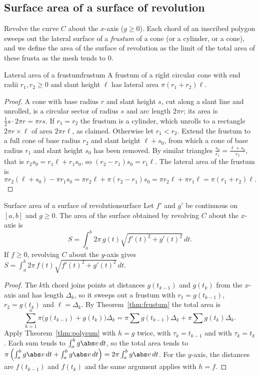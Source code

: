\documentclass[11pt]{article}
\begin{document}
\subsection*{Surface area of a surface of revolution}

Revolve the curve $C$ about the $x$-axis ($g\ge0$). Each chord of an inscribed polygon sweeps out the lateral surface of a \emph{frustum} of a cone (or a cylinder, or a cone), and we define the area of the surface of revolution as the limit of the total area of these frusta as the mesh tends to $0$.

\begin{thm}{Lateral area of a frustum}{frustum}
A frustum of a right circular cone with end radii $r_1,r_2\ge0$ and slant height $\ell$ has lateral area $\pi(r_1+r_2)\ell$.
\end{thm}
\begin{proof}
A cone with base radius $r$ and slant height $s$, cut along a slant line and unrolled, is a circular sector of radius $s$ and arc length $2\pi r$; its area is $\frac12s\cdot2\pi r=\pi rs$. If $r_1=r_2$ the frustum is a cylinder, which unrolls to a rectangle $2\pi r\times\ell$ of area $2\pi r\ell$, as claimed. Otherwise let $r_1<r_2$. Extend the frustum to a full cone of base radius $r_2$ and slant height $\ell+s_0$, from which a cone of base radius $r_1$ and slant height $s_0$ has been removed. By similar triangles $\frac{s_0}{r_1}=\frac{\ell+s_0}{r_2}$, that is $r_2s_0=r_1\ell+r_1s_0$, so $(r_2-r_1)s_0=r_1\ell$. The lateral area of the frustum is
\[
\pi r_2(\ell+s_0)-\pi r_1s_0=\pi r_2\ell+\pi(r_2-r_1)s_0=\pi r_2\ell+\pi r_1\ell=\pi(r_1+r_2)\ell.
\]
\end{proof}

\begin{thm}{Surface area of a surface of revolution}{surface}
Let $f'$ and $g'$ be continuous on $[a,b]$ and $g\ge0$. The area of the surface obtained by revolving $C$ about the $x$-axis is
\[
S=\int_a^b2\pi\,g(t)\sqrt{f'(t)^2+g'(t)^2}\,dt.
\]
If $f\ge0$, revolving $C$ about the $y$-axis gives $S=\int_a^b2\pi\,f(t)\sqrt{f'(t)^2+g'(t)^2}\,dt$.
\end{thm}
\begin{proof}
The $k$th chord joins points at distances $g(t_{k-1})$ and $g(t_k)$ from the $x$-axis and has length $\Delta_k$, so it sweeps out a frustum with $r_1=g(t_{k-1})$, $r_2=g(t_k)$ and $\ell=\Delta_k$. By Theorem~\ref{thm:frustum} the total area is
\[
\sum_{k=1}^n\pi\bigl(g(t_{k-1})+g(t_k)\bigr)\Delta_k=\pi\sum g(t_{k-1})\Delta_k+\pi\sum g(t_k)\Delta_k.
\]
Apply Theorem~\ref{thm:polysum} with $h=g$ twice, with $\tau_k=t_{k-1}$ and with $\tau_k=t_k$. Each sum tends to $\int_a^bg\abs v\,dt$, so the total area tends to $\pi\left(\int_a^bg\abs v\,dt+\int_a^bg\abs v\,dt\right)=2\pi\int_a^bg\abs v\,dt$. For the $y$-axis, the distances are $f(t_{k-1})$ and $f(t_k)$ and the same argument applies with $h=f$.
\end{proof}
\end{document}
